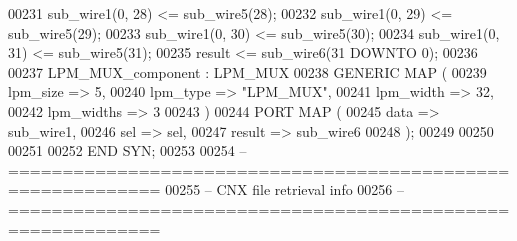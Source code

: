 \begin{DoxyCode}
{00231     \textcolor{vhdlchar}{sub_wire1}\textcolor{vhdlchar}{(}\textcolor{vhdllogic}{}\textcolor{vhdllogic}{0}\textcolor{vhdlchar}{,} \textcolor{vhdllogic}{}\textcolor{vhdllogic}{28}\textcolor{vhdlchar}{)}    \textcolor{vhdlchar}{<=} \textcolor{vhdlchar}{sub_wire5}\textcolor{vhdlchar}{(}\textcolor{vhdllogic}{}\textcolor{vhdllogic}{28}\textcolor{vhdlchar}{)};
00232     \textcolor{vhdlchar}{sub_wire1}\textcolor{vhdlchar}{(}\textcolor{vhdllogic}{}\textcolor{vhdllogic}{0}\textcolor{vhdlchar}{,} \textcolor{vhdllogic}{}\textcolor{vhdllogic}{29}\textcolor{vhdlchar}{)}    \textcolor{vhdlchar}{<=} \textcolor{vhdlchar}{sub_wire5}\textcolor{vhdlchar}{(}\textcolor{vhdllogic}{}\textcolor{vhdllogic}{29}\textcolor{vhdlchar}{)};
00233     \textcolor{vhdlchar}{sub_wire1}\textcolor{vhdlchar}{(}\textcolor{vhdllogic}{}\textcolor{vhdllogic}{0}\textcolor{vhdlchar}{,} \textcolor{vhdllogic}{}\textcolor{vhdllogic}{30}\textcolor{vhdlchar}{)}    \textcolor{vhdlchar}{<=} \textcolor{vhdlchar}{sub_wire5}\textcolor{vhdlchar}{(}\textcolor{vhdllogic}{}\textcolor{vhdllogic}{30}\textcolor{vhdlchar}{)};
00234     \textcolor{vhdlchar}{sub_wire1}\textcolor{vhdlchar}{(}\textcolor{vhdllogic}{}\textcolor{vhdllogic}{0}\textcolor{vhdlchar}{,} \textcolor{vhdllogic}{}\textcolor{vhdllogic}{31}\textcolor{vhdlchar}{)}    \textcolor{vhdlchar}{<=} \textcolor{vhdlchar}{sub_wire5}\textcolor{vhdlchar}{(}\textcolor{vhdllogic}{}\textcolor{vhdllogic}{31}\textcolor{vhdlchar}{)};
00235     \textcolor{vhdlchar}{result}    \textcolor{vhdlchar}{<=} \textcolor{vhdlchar}{sub_wire6}\textcolor{vhdlchar}{(}\textcolor{vhdllogic}{}\textcolor{vhdllogic}{31} \textcolor{keywordflow}{DOWNTO} \textcolor{vhdllogic}{}\textcolor{vhdllogic}{0}\textcolor{vhdlchar}{)};
00236 
00237     LPM\_MUX\_component : LPM\_MUX
00238     \textcolor{keywordflow}{GENERIC} \textcolor{keywordflow}{MAP} (
00239         lpm\_size => \textcolor{vhdllogic}{5},
00240         lpm\_type => \textcolor{keyword}{"LPM\_MUX"},
00241         lpm\_width => \textcolor{vhdllogic}{32},
00242         lpm\_widths => \textcolor{vhdllogic}{3}
00243     \textcolor{vhdlchar}{)}
00244     \textcolor{keywordflow}{PORT} \textcolor{keywordflow}{MAP} (
00245         data => sub_wire1,
00246         sel => sel,
00247         result => sub_wire6
00248     \textcolor{vhdlchar}{)};
00249 
00250 
00251 
00252 \textcolor{keywordflow}{END} \textcolor{vhdlchar}{SYN};
00253 
00254 \textcolor{keyword}{-- ============================================================}
00255 \textcolor{keyword}{-- CNX file retrieval info}
00256 \textcolor{keyword}{-- ============================================================}
}
\end{DoxyCode}
